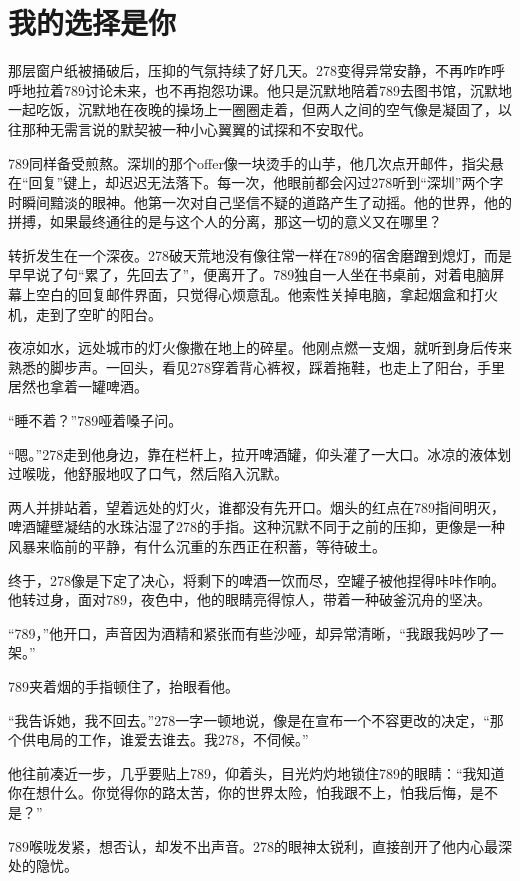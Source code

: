 \documentclass[a4paper]{book}
\begin{document}
\normalsize
\section{我的选择是你}
\songti{}
那层窗户纸被捅破后，压抑的气氛持续了好几天。278变得异常安静，不再咋咋呼呼地拉着789讨论未来，也不再抱怨功课。他只是沉默地陪着789去图书馆，沉默地一起吃饭，沉默地在夜晚的操场上一圈圈走着，但两人之间的空气像是凝固了，以往那种无需言说的默契被一种小心翼翼的试探和不安取代。

789同样备受煎熬。深圳的那个offer像一块烫手的山芋，他几次点开邮件，指尖悬在“回复”键上，却迟迟无法落下。每一次，他眼前都会闪过278听到“深圳”两个字时瞬间黯淡的眼神。他第一次对自己坚信不疑的道路产生了动摇。他的世界，他的拼搏，如果最终通往的是与这个人的分离，那这一切的意义又在哪里？

转折发生在一个深夜。278破天荒地没有像往常一样在789的宿舍磨蹭到熄灯，而是早早说了句“累了，先回去了”，便离开了。789独自一人坐在书桌前，对着电脑屏幕上空白的回复邮件界面，只觉得心烦意乱。他索性关掉电脑，拿起烟盒和打火机，走到了空旷的阳台。

夜凉如水，远处城市的灯火像撒在地上的碎星。他刚点燃一支烟，就听到身后传来熟悉的脚步声。一回头，看见278穿着背心裤衩，踩着拖鞋，也走上了阳台，手里居然也拿着一罐啤酒。

“睡不着？”789哑着嗓子问。

“嗯。”278走到他身边，靠在栏杆上，拉开啤酒罐，仰头灌了一大口。冰凉的液体划过喉咙，他舒服地叹了口气，然后陷入沉默。

两人并排站着，望着远处的灯火，谁都没有先开口。烟头的红点在789指间明灭，啤酒罐壁凝结的水珠沾湿了278的手指。这种沉默不同于之前的压抑，更像是一种风暴来临前的平静，有什么沉重的东西正在积蓄，等待破土。

终于，278像是下定了决心，将剩下的啤酒一饮而尽，空罐子被他捏得咔咔作响。他转过身，面对789，夜色中，他的眼睛亮得惊人，带着一种破釜沉舟的坚决。

“789，”他开口，声音因为酒精和紧张而有些沙哑，却异常清晰，“我跟我妈吵了一架。”

789夹着烟的手指顿住了，抬眼看他。

“我告诉她，我不回去。”278一字一顿地说，像是在宣布一个不容更改的决定，“那个供电局的工作，谁爱去谁去。我278，不伺候。”

他往前凑近一步，几乎要贴上789，仰着头，目光灼灼地锁住789的眼睛：“我知道你在想什么。你觉得你的路太苦，你的世界太险，怕我跟不上，怕我后悔，是不是？”

789喉咙发紧，想否认，却发不出声音。278的眼神太锐利，直接剖开了他内心最深处的隐忧。
\end{document}

